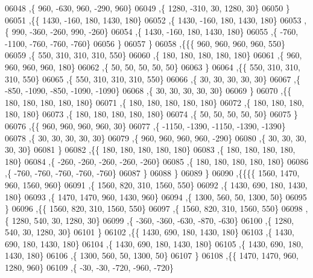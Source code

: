 \begin{DoxyCode}
06048     ,\{   960,  -630,   960,  -290,   960\}
06049     ,\{  1280,  -310,    30,  1280,    30\}
06050     \}
06051    ,\{\{  1430,  -160,   180,  1430,   180\}
06052     ,\{  1430,  -160,   180,  1430,   180\}
06053     ,\{   990,  -360,  -260,   990,  -260\}
06054     ,\{  1430,  -160,   180,  1430,   180\}
06055     ,\{  -760, -1100,  -760,  -760,  -760\}
06056     \}
06057    \}
06058   ,\{\{\{   960,   960,   960,   960,   550\}
06059     ,\{   550,   310,   310,   310,   550\}
06060     ,\{   180,   180,   180,   180,   180\}
06061     ,\{   960,   960,   960,   960,   180\}
06062     ,\{    50,    50,    50,    50,    50\}
06063     \}
06064    ,\{\{   550,   310,   310,   310,   550\}
06065     ,\{   550,   310,   310,   310,   550\}
06066     ,\{    30,    30,    30,    30,    30\}
06067     ,\{  -850, -1090,  -850, -1090, -1090\}
06068     ,\{    30,    30,    30,    30,    30\}
06069     \}
06070    ,\{\{   180,   180,   180,   180,   180\}
06071     ,\{   180,   180,   180,   180,   180\}
06072     ,\{   180,   180,   180,   180,   180\}
06073     ,\{   180,   180,   180,   180,   180\}
06074     ,\{    50,    50,    50,    50,    50\}
06075     \}
06076    ,\{\{   960,   960,   960,   960,    30\}
06077     ,\{ -1150, -1390, -1150, -1390, -1390\}
06078     ,\{    30,    30,    30,    30,    30\}
06079     ,\{   960,   960,   960,   960,  -290\}
06080     ,\{    30,    30,    30,    30,    30\}
06081     \}
06082    ,\{\{   180,   180,   180,   180,   180\}
06083     ,\{   180,   180,   180,   180,   180\}
06084     ,\{  -260,  -260,  -260,  -260,  -260\}
06085     ,\{   180,   180,   180,   180,   180\}
06086     ,\{  -760,  -760,  -760,  -760,  -760\}
06087     \}
06088    \}
06089   \}
06090  ,\{\{\{\{  1560,  1470,   960,  1560,   960\}
06091     ,\{  1560,   820,   310,  1560,   550\}
06092     ,\{  1430,   690,   180,  1430,   180\}
06093     ,\{  1470,  1470,   960,  1430,   960\}
06094     ,\{  1300,   560,    50,  1300,    50\}
06095     \}
06096    ,\{\{  1560,   820,   310,  1560,   550\}
06097     ,\{  1560,   820,   310,  1560,   550\}
06098     ,\{  1280,   540,    30,  1280,    30\}
06099     ,\{  -360,  -360,  -630,  -870,  -630\}
06100     ,\{  1280,   540,    30,  1280,    30\}
06101     \}
06102    ,\{\{  1430,   690,   180,  1430,   180\}
06103     ,\{  1430,   690,   180,  1430,   180\}
06104     ,\{  1430,   690,   180,  1430,   180\}
06105     ,\{  1430,   690,   180,  1430,   180\}
06106     ,\{  1300,   560,    50,  1300,    50\}
06107     \}
06108    ,\{\{  1470,  1470,   960,  1280,   960\}
06109     ,\{   -30,   -30,  -720,  -960,  -720\}

\end{DoxyCode}

